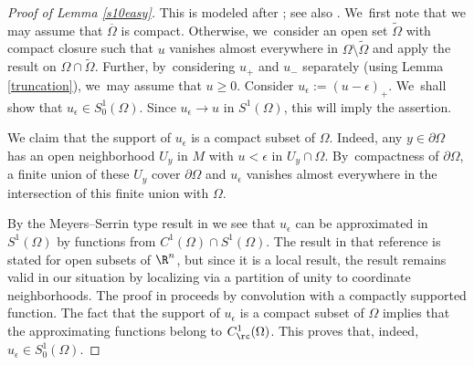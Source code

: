\begin{proof}[Proof of Lemma \ref{s10easy}]
This is modeled after \cite[Lem.\,1.26]{HeKiMa}; see also \cite[Lem.\,1]{HeNoSw}. We~first note that we may assume that $\overline\Omega$ is compact. Otherwise, we~consider an open set $\widetilde \Omega$ with compact closure such that $u$ vanishes almost everywhere in $\Omega\setminus\widetilde \Omega$ and apply the result on $\Omega\cap\widetilde \Omega$. Further, by~considering $u_+$ and $u_-$ separately (using Lemma \ref{truncation}), we~may assume that $u\geq 0$. Consider $u_\epsilon:=(u-\epsilon)_+$. We~shall show that $u_\epsilon\in S^1_0(\Omega)$. Since $u_\epsilon\to u$ in $S^1(\Omega)$, this will imply the assertion.

We claim that the support of $u_\epsilon$ is a compact subset of $\Omega$. Indeed, any $y\in\partial\Omega$ has an open neighborhood $U_y$ in $M$ with $u<\epsilon$ in $U_y\cap\Omega$. By~compactness of $\partial\Omega$, a finite union of these $U_y$ cover $\partial\Omega$ and $u_\epsilon$ vanishes almost everywhere in the intersection of this finite union with $\Omega$.

By the Meyers--Serrin type result in \cite[Th.\,1.13]{GaNh} we see that $u_\epsilon$ can be approximated in $S^1(\Omega)$ by functions from $C^1(\Omega)\cap S^1(\Omega)$. The result in that reference is stated for open subsets of $\R^n$, but since it is a local result, the result remains valid in our situation by localizing via a partition of unity to coordinate neighborhoods. The proof in \cite{GaNh} proceeds by convolution with a compactly supported function. The fact that the support of $u_\epsilon$ is a compact subset of $\Omega$ implies that the approximating functions belong to $C^1_\rc(\Omega)$. This proves that, indeed, $u_\epsilon\in S^1_0(\Omega)$.
\end{proof}

